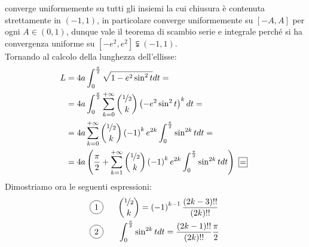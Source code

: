 converge uniformemente su tutti gli insiemi la cui chiusura è contenuta strettamente in $\left(-1,1\right)$, in particolare converge uniformemente su $\left[-A,A\right]$ per ogni $A\in\left(0,1\right)$, dunque vale il teorema di scambio serie e integrale perché si ha convergenza uniforme su $\left[-e^2,e^2\right]\subsetneqq\left(-1,1\right)$.\\
Tornando al calcolo della lunghezza dell'ellisse:
\begin{align*}
	L&=4a\int_{0}^{\frac{\pi}{2}}\sqrt{1-e^2\sin^2t}dt=\\
	&=4a\int_{0}^{\frac{\pi}{2}}\sum_{k=0}^{+\infty}\binom{\nicefrac{1}{2}}{k}\left(-e^2\sin^2t\right)^kdt=\\
	&=4a\sum_{k=0}^{+\infty}\binom{\nicefrac{1}{2}}{k}\left(-1\right)^ke^{2k}\int_{0}^{\frac{\pi}{2}}\sin^{2k}tdt=\\
	&=4a\left(\frac{\pi}{2}+\sum_{k=1}^{+\infty}\binom{\nicefrac{1}{2}}{k}\left(-1\right)^ke^{2k}\int_{0}^{\frac{\pi}{2}}\sin^{2k}tdt\right)\squarequal
\end{align*}
Dimostriamo ora le seguenti espressioni:
\begin{align*}
	\circled{1}&\qquad\binom{\nicefrac{1}{2}}{k}=\left(-1\right)^{k-1}\frac{\left(2k-3\right)!!}{\left(2k\right)!!}\\
	\circled{2}&\qquad\int_{0}^{\frac{\pi}{2}}\sin^{2k}tdt=\frac{\left(2k-1\right)!!}{\left(2k\right)!!}\frac{\pi}{2}
\end{align*}
